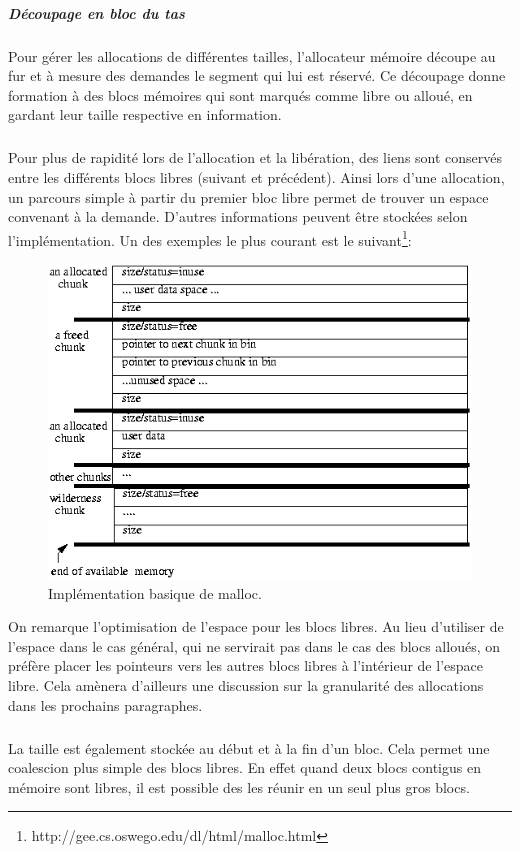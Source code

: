 \subparagraph{Découpage en bloc du tas}
Pour gérer les allocations de différentes tailles, l'allocateur mémoire découpe au fur et à mesure des demandes
le segment qui lui est réservé. Ce découpage donne formation à des blocs mémoires qui sont marqués comme libre ou alloué, en gardant leur taille respective
en information.
\subparagraph{}
Pour plus de rapidité lors de l'allocation et la libération, des liens sont conservés entre les différents blocs libres (suivant et précédent). Ainsi lors d'une allocation,
un parcours simple à partir du premier bloc libre permet de trouver un espace convenant à la demande. D'autres informations peuvent être stockées selon l'implémentation.
Un des exemples le plus courant est le suivant\footnote{http://gee.cs.oswego.edu/dl/html/malloc.html}:
\begin{figure}[h]
    \centering
    \includegraphics[scale=0.5]{malloc.png}\newline
    \caption{Implémentation basique de malloc.}
\end{figure}

On remarque l'optimisation de l'espace pour les blocs libres. Au lieu d'utiliser de l'espace dans le cas général, qui ne servirait pas dans le cas des blocs alloués,
on préfère placer les pointeurs vers les autres blocs libres à l'intérieur de l'espace libre. Cela amènera d'ailleurs une discussion sur la granularité des allocations dans
les prochains paragraphes.
\subparagraph{}
La taille est également stockée au début et à la fin d'un bloc. Cela permet une coalescion plus simple des blocs libres. En effet quand deux blocs contigus en
mémoire sont libres, il est possible des les réunir en un seul plus gros blocs.


